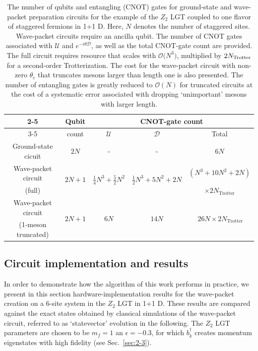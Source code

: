\documentclass[a4paper,onecolumn,11pt,accepted=2024-10-11]{quantumarticle}
\begin{document}
%
\begin{table}[]
\centering
\begin{tabular}{|c|c|c|c|c|}
\cline{2-5} 
\multicolumn{1}{c|}{} & Qubit & \multicolumn{3}{c|}{CNOT-gate count}\tabularnewline
\cline{3-5} 
\multicolumn{1}{c|}{} & count & $\mathcal{U}$ & $\mathcal{D}$ & Total\tabularnewline
\hline 
\hline 
Ground-state cicuit & $2N$ & - & - & $6N$\tabularnewline
\hline 
Wave-packet circuit & \multirow{2}{*}{$2N+1$} & \multirow{2}{*}{$\frac{1}{4}N^{3}+\frac{5}{2}N^{2}$} & \multirow{2}{*}{$\frac{1}{2}N^{3}+5N^{2}+2N$} & {$\left(N^{3}+10N^{2}+2N\right)$}\tabularnewline
(full) &  &  &  & $\times 2N_{\textrm{Trotter}}$\tabularnewline
\hline 
Wave-packet circuit & \multirow{2}{*}{$2N+1$} & \multirow{2}{*}{$6N$} & \multirow{2}{*}{$14N$} & \multirow{2}{*}{$\ 26N\times 2N_{\textrm{Trotter}}$}\tabularnewline
(1-meson truncated) &  &  &  & \tabularnewline
\hline 
\end{tabular}
\caption{The number of qubits and entangling (CNOT) gates for ground-state and wave-packet preparation circuits for the example of the $Z_2$ LGT coupled to one flavor of staggered fermions in 1+1 D. Here, $N$ denotes the number of staggered sites. Wave-packet circuits require an ancilla qubit. The number of CNOT gates associated with $\mathcal{U}$ and $e^{-i\theta\mathcal{D}}$, as well as the total CNOT-gate count are provided. The full circuit requires resource that scales with $\mathcal{O(}N^3)$, multiplied by $2N_{\rm Trotter}$ for a second-order Trotterization. The cost for the wave-packet circuit with non-zero $\theta_c$ that truncates mesons larger than length one is also presented. The number of entangling gates is greatly reduced to $\mathcal{O}(N)$ for truncated circuits at the cost of a systematic error associated with dropping `unimportant' mesons with larger length.}
\label{tabel:gate-count}
\end{table}
%

\subsection{
Circuit implementation and results}
\label{sec:3-2}
In order to demonstrate how the algorithm of this work performs in practice, we present in this section hardware-implementation results for the wave-packet creation on a 6-site system in the $Z_2$ LGT in 1+1 D. These results are compared against the exact states obtained by classical simulations of the wave-packet circuit, referred to as `statevector' evolution in the following. The $Z_2$ LGT parameters are chosen to be $m_f=1$ an $\epsilon=-0.3$, for which $b_k^\dagger$ creates momentum eigenstates with high fidelity (see Sec.~\ref{sec:2-3}). 
\end{document}
